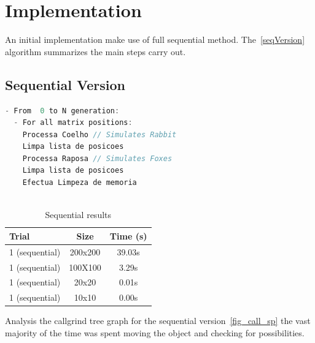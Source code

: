 \documentclass[10pt,a4paper,final]{report}
\begin{document}
  
\section{Implementation}
An initial implementation make use of full sequential method. The~\ref{seqVersion} algorithm summarizes the main steps carry out.


\subsection{Sequential Version}
\begin{lstlisting}[language=c,frame=single,basicstyle=\footnotesize,caption={Sequential Version.},label=seqVersion]
- From  0 to N generation:
  - For all matrix positions:
    Processa Coelho // Simulates Rabbit
  	Limpa lista de posicoes
  	Processa Raposa // Simulates Foxes
    Limpa lista de posicoes
    Efectua Limpeza de memoria
    
\end{lstlisting}

\begin{table}[H]
\begin{center}
    \begin{tabular}{ | l | c | c |}
      \hline
      \textbf{Trial} & \textbf{Size} & \textbf{Time (s)} \\ \hline
	  1 (sequential) & 200x200 & 39.03s  \\ \hline      
      1 (sequential) & 100X100 & 3.29s  \\ \hline
	  1 (sequential) & 20x20 & 0.01s  \\ \hline
	  1 (sequential) & 10x10 & 0.00s  \\ \hline
	  
  \end{tabular}
  \caption{Sequential results}
  \label{tbl:resultados1}
\end{center}
\end{table}

Analysis the callgrind tree graph for the sequential version~\ref{fig_call_sp} the vast majority of the time was spent moving the object and checking for possibilities.
\end{document}
